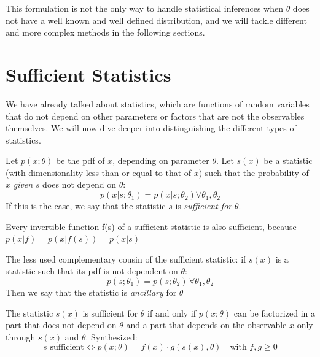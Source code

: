  This formulation is not the only way to handle statistical inferences when $\theta$ does not have a well known and well defined distribution, and we will tackle different and more complex methods in the following sections.

\section{Sufficient Statistics}

We have already talked about statistics, which are functions of random variables that do not depend on other parameters or factors that are not the observables themselves. We will now dive deeper into distinguishing the different types of statistics. 

\begin{definition}
	Let $p(x;\theta)$ be the pdf of $x$, depending on parameter $\theta$. Let $s(x)$ be a statistic (with dimensionality less than or equal to that of $x$) such that the probability of $x$ \emph{given} $s$ does not depend on $\theta$:
	\[
	p(x|s;\theta_1) = p(x|s;\theta_2) \forall\theta_1,\theta_2
	\]
	If this is the case, we say that the statistic $s$ is \emph{sufficient for} $\theta$.
\end{definition}
\begin{corollary}
	Every invertible function f(s) of a sufficient statistic is also sufficient, because $p(x|f) = p(x | f(s)) = p(x|s)$\sidenotemark
\end{corollary}
\begin{definition}
	The less used complementary cousin of the sufficient statistic: if $s(x)$ is a statistic such that its pdf is not dependent on $\theta$:
	\[
	p(s;\theta_1) = p(s;\theta_2) \, \forall \theta_1,\theta_2
	\]
	Then we say that the statistic is \emph{ancillary} for $\theta$
\end{definition}
\begin{theorem}
	The statistic $s(x)$ is sufficient for $\theta$ if and only if $p(x;\theta)$ can be factorized in a part that does not depend on $\theta$ and a part that depends on the observable $x$ only through $s(x)$ and $\theta$. Synthesized:
	\[
	s \text{ sufficient}\iff p(x;\theta) = f(x)\cdot g(s(x),\theta) \quad \text{with } f,g\geq0
	\]
\label{th:factorization}
\end{theorem}

